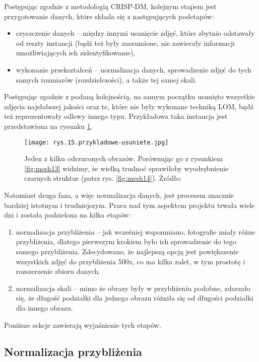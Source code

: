 Postępując zgodnie z metodologią CRISP-DM, kolejnym etapem jest przygotowanie danych, które składa się z następujących podetapów:
\begin{itemize}
\item czyszczenie danych – między innymi usunięcie zdjęć, które zbytnio odstawały od reszty instancji (bądź też były zaszumione, nie zawierały informacji umożliwiających ich zidentyfikowanie),
\item wykonanie przekształceń – normalizacja danych, sprowadzenie zdjęć do tych samych rozmiarów (rozdzielczości), a także tej samej skali.
\end{itemize}
Postępując zgodnie z podaną kolejnością, na samym początku usunięto wszystkie zdjęcia najsłabszej jakości oraz te, które nie były wykonane techniką LOM, bądź też reprezentowały odlewy innego typu. Przykładowa taka instancja jest przedstawiona na rysunku \ref{fig:mesh15}. %
\begin{figure}[h]
    \centering
    \texttt{[image: rys.15.przykladowe-usuniete.jpg]}
    \caption{Jeden z kilku odrzuconych obrazów. Porównując go z rysunkiem \ref{fig:mesh13} widzimy, że wielką trudnoć sprawiłoby wyodrębnienie czarnych struktur (patrz rys. \ref{fig:mesh14}). Żródło: \cite{Pirowski17}}
    \label{fig:mesh15}
\end{figure}
Natomiast druga faza, a więc normalizacja danych, jest procesem znacznie bardziej istotnym i trudniejszym. Praca nad tym aspektem projektu trwała wiele dni i została podzielona na kilka etapów:
\begin{enumerate}
\item normalizacja przybliżenia – jak wcześniej wspomniano, fotografie miały różne przybliżenia, dlatego pierwszym krokiem było ich sprowadzenie do tego samego przybliżenia. Zdecydowano, że najlepszą opcją jest powiększenie wszystkich zdjęć do przybliżenia 500x, co ma kilka zalet, w tym prostotę i rozszerzenie zbioru danych.
\item normalizacja skali – mimo że obrazy były w przybliżeniu podobne, zdarzało się, że długość podziałki dla jednego obrazu różniła się od długości podziałki dla innego obrazu.
\end{enumerate}
Poniższe sekcje zawierają wyjaśnienie tych etapów.


\subsection{Normalizacja przybliżenia}
\label{sec:normalizacja_przyblizenia}

